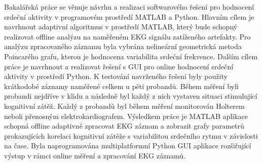 Bakalářská práce se věnuje návrhu a realizaci softwarového řešení pro hodnocení
srdeční aktivity v programovém prostředí MATLAB a Python. Hlavním cílem je
navrhnout adaptivní algoritmus v prostředí MATLAB, který bude schopný realizovat
offline analýzu na naměřeném EKG signálu zatíženého artefakty. Pro analýzu
zpracovaného záznamu byla vybrána nelineární geometrická metoda Poincarého
grafu, kterou je hodnocena variabilita srdeční frekvence. Dalším cílem práce je
navrhnout a realizovat řešení s GUI pro online hodnocení srdeční aktivity v
prostředí Python. K testování navrženého řešení byly použity krátkodobé záznamy
naměřené celkem u pěti probandů. Během měření byli probandi nejdříve v klidu a
následně byl každý z nich vystaven situaci stimulující kognitivní zátěž. Každý z
probandů byl během měření monitorován Holterem neboli přenosným
elektrokardiografem. Výsledkem práce je MATLAB aplikace schopná offline
adaptivně zpracovat EKG záznam a zobrazit grafy parametrů prokazujících korelaci
kognitivní zátěže s variabilitou srdečního rytmu v závislosti na čase. Byla
naprogramována multiplatformní Python GUI aplikace rozšiřující výstup v rámci
online měření a zpracování EKG záznamů. 

